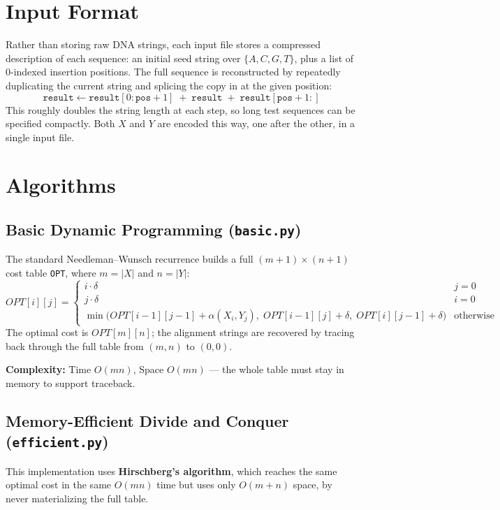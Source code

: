 \documentclass[11pt]{article}
\begin{document}
\section{Input Format}

Rather than storing raw DNA strings, each input file stores a compressed
description of each sequence: an initial seed string over $\{A, C, G, T\}$,
plus a list of 0-indexed insertion positions. The full sequence is
reconstructed by repeatedly duplicating the current string and splicing the
copy in at the given position:
\[
\texttt{result} \leftarrow \texttt{result}[0:\texttt{pos}+1] \;+\;
\texttt{result} \;+\; \texttt{result}[\texttt{pos}+1:]
\]
This roughly doubles the string length at each step, so long test sequences
can be specified compactly. Both $X$ and $Y$ are encoded this way, one after
the other, in a single input file.

\section{Algorithms}

\subsection{Basic Dynamic Programming (\texttt{basic.py})}

The standard Needleman--Wunsch recurrence builds a full $(m{+}1) \times (n{+}1)$
cost table \texttt{OPT}, where $m = |X|$ and $n = |Y|$:
\[
OPT[i][j] =
\begin{cases}
  i \cdot \delta & j = 0 \\
  j \cdot \delta & i = 0 \\
  \min\big(OPT[i-1][j-1] + \alpha(X_i, Y_j),\; OPT[i-1][j] + \delta,\;
  OPT[i][j-1] + \delta\big) & \text{otherwise}
\end{cases}
\]
The optimal cost is $OPT[m][n]$; the alignment strings are recovered by
tracing back through the full table from $(m,n)$ to $(0,0)$.

\textbf{Complexity:} Time $O(mn)$, Space $O(mn)$ --- the whole table must stay
in memory to support traceback.

\subsection{Memory-Efficient Divide and Conquer (\texttt{efficient.py})}

This implementation uses \textbf{Hirschberg's algorithm}, which reaches the
same optimal cost in the same $O(mn)$ time but uses only $O(m+n)$ space, by
never materializing the full table.
\end{document}

